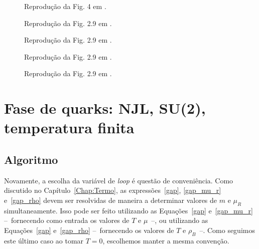 \begin{figure}
	
	\caption{Reprodução da Fig. 4 em \textcite{japoneses2}. \protect}
	\label{Fig:Press_Tsue}
\end{figure}


\begin{figure}
	
	\caption{Reprodução da Fig. 2.9 em \textcite{Buballa}. \protect}
	\label{Fig:Buballa_2.9_1}
\end{figure}

\begin{figure}
	
	\caption{Reprodução da Fig. 2.9 em \textcite{Buballa}. \protect}
	\label{Fig:Buballa_2.9_2}
\end{figure}

\begin{figure}
	
	\caption{Reprodução da Fig. 2.9 em \textcite{Buballa}. \protect}
	\label{Fig:Buballa_2.9_3}
\end{figure}

\begin{figure}
	
	\caption{Reprodução da Fig. 2.9 em \textcite{Buballa}. \protect}
	\label{Fig:Buballa_2.9_4}
\end{figure}

\FloatBarrier

\section{Fase de quarks: NJL, SU(2), temperatura finita}

\subsection{Algoritmo}

Novamente, a escolha da variável de \emph{loop} é questão de conveniência. Como discutido no Capítulo~\ref{Chap:Termo}, as expressões~\eqref{gap}, \eqref{gap_mu_r} e~\eqref{gap_rho} devem ser resolvidas de maneira a determinar valores de $m$ e $\mu_R$ simultaneamente. Isso pode ser feito utilizando as Equações~\eqref{gap} e~\eqref{gap_mu_r} --~fornecendo como entrada os valores de $T$ e $\mu$~--, ou utilizando as Equações~\eqref{gap} e~\eqref{gap_rho} --~fornecendo os valores de $T$ e $\rho_B$~--. Como seguimos este último caso ao tomar $T = 0$, escolhemos manter a mesma convenção.

